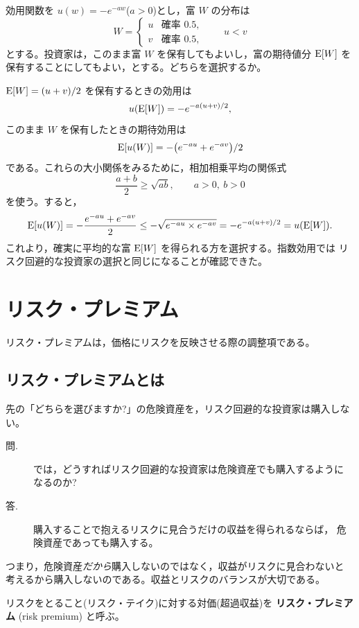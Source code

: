 \begin{example}[指数効用による議論の例]
効用関数を $u(w) = -e^{-aw}$($a>0$)とし，富 $W$ の分布は
\[
W = \begin{cases} u & \text{確率 } 0.5,\\ v & \text{確率 } 0.5,\end{cases}
\qquad u < v
\]
とする。投資家は，このまま富 $W$ を保有してもよいし，富の期待値分 $\mathrm{E}[W]$ を
保有することにしてもよい，とする。どちらを選択するか。

$\mathrm{E}[W] = (u+v)/2$ を保有するときの効用は
\[
u(\mathrm{E}[W]) = -e^{-a(u+v)/2},
\]
このまま $W$ を保有したときの期待効用は
\[
\mathrm{E}[u(W)] = -\bigl(e^{-au} + e^{-av}\bigr)/2
\]
である。これらの大小関係をみるために，相加相乗平均の関係式
\[
\frac{a+b}{2} \geq \sqrt{ab},\qquad a>0,\ b>0
\]
を使う。すると，
\[
\mathrm{E}[u(W)] = -\frac{e^{-au}+e^{-av}}{2}
\leq -\sqrt{e^{-au}\times e^{-av}}
= -e^{-a(u+v)/2}
= u(\mathrm{E}[W]).
\]
これより，確実に平均的な富 $\mathrm{E}[W]$ を得られる方を選択する。指数効用では
リスク回避的な投資家の選択と同じになることが確認できた。
\end{example}

\vspace{18pt}

\section{リスク・プレミアム}

リスク・プレミアムは，価格にリスクを反映させる際の調整項である。

\subsection{リスク・プレミアムとは}

先の「どちらを選びますか?」の危険資産を，リスク回避的な投資家は購入しない。

\begin{description}
\item[問.] では，どうすればリスク回避的な投資家は危険資産でも購入するように
なるのか?
\item[答.] 購入することで抱えるリスクに見合うだけの収益を得られるならば，
危険資産であっても購入する。
\end{description}

つまり，危険資産\emph{だから}購入しないのではなく，収益がリスクに見合わないと
考えるから購入しないのである。収益とリスクのバランスが大切である。

\begin{definition}
リスクをとること(リスク・テイク)に対する対価(超過収益)を
\textbf{リスク・プレミアム} (risk premium) と呼ぶ。
\end{definition}


